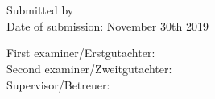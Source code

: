\thispagestyle{empty}

\noindent\myTitle \\
\noindent\myDegree \\

\bigskip

\noindent Submitted by \myName \\
\noindent Date of submission: November 30th 2019

\bigskip

\noindent  First examiner/Erstgutachter: \myProf \\
\noindent Second examiner/Zweitgutachter: \myOtherProf \\
\noindent Supervisor/Betreuer: \mySupervisor \\

\hfill

\vfill

\noindent \myUni \\
\noindent \myDepartment \\
\noindent \myFaculty \\


%
%
%
%
%

